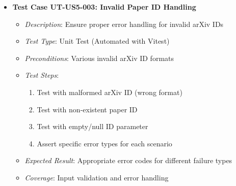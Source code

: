 \documentclass[12pt]{article}
\begin{document}
\begin{itemize}
  \item \textbf{Test Case UT-US5-003: Invalid Paper ID Handling}
    \begin{itemize}
      \item \textit{Description}: Ensure proper error handling for invalid arXiv IDs
      \item \textit{Test Type}: Unit Test (Automated with Vitest)
      \item \textit{Preconditions}: Various invalid arXiv ID formats
      \item \textit{Test Steps}:
        \begin{enumerate}
          \item Test with malformed arXiv ID (wrong format)
          \item Test with non-existent paper ID
          \item Test with empty/null ID parameter
          \item Assert specific error types for each scenario
        \end{enumerate}
      \item \textit{Expected Result}: Appropriate error codes for different failure types
      \item \textit{Coverage}: Input validation and error handling
    \end{itemize}
\end{itemize}
\end{document}
